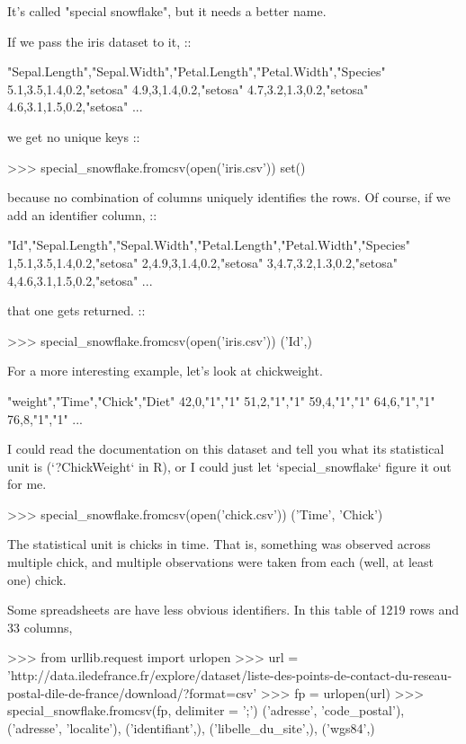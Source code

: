 \documentclass{acm_proc_article-sp}
\begin{document}
It's called "special snowflake", but it needs a better name.

If we pass the iris dataset to it, ::

    "Sepal.Length","Sepal.Width","Petal.Length","Petal.Width","Species"
    5.1,3.5,1.4,0.2,"setosa"
    4.9,3,1.4,0.2,"setosa"
    4.7,3.2,1.3,0.2,"setosa"
    4.6,3.1,1.5,0.2,"setosa"
    ...

we get no unique keys ::

    >>> special_snowflake.fromcsv(open('iris.csv'))                                                                  
    set()

because no combination of columns uniquely identifies the rows.
Of course, if we add an identifier column, ::

    "Id","Sepal.Length","Sepal.Width","Petal.Length","Petal.Width","Species"
    1,5.1,3.5,1.4,0.2,"setosa"
    2,4.9,3,1.4,0.2,"setosa"
    3,4.7,3.2,1.3,0.2,"setosa"
    4,4.6,3.1,1.5,0.2,"setosa"
    ...

that one gets returned. ::

    >>> special_snowflake.fromcsv(open('iris.csv'))                                                                  
    {('Id',)}

For a more interesting example, let's look at chickweight.

    "weight","Time","Chick","Diet"
    42,0,"1","1"
    51,2,"1","1"
    59,4,"1","1"
    64,6,"1","1"
    76,8,"1","1"
    ...

I could read the documentation on this dataset and tell you
what its statistical unit is (`?ChickWeight` in R), or I could
just let `special_snowflake` figure it out for me.

    >>> special_snowflake.fromcsv(open('chick.csv'))
    {('Time', 'Chick')}

The statistical unit is chicks in time. That is, something was
observed across multiple chick, and multiple observations were
taken from each (well, at least one) chick.

Some spreadsheets are have less obvious identifiers. In this
table of 1219 rows and 33 columns,

    >>> from urllib.request import urlopen
    >>> url = 'http://data.iledefrance.fr/explore/dataset/liste-des-points-de-contact-du-reseau-postal-dile-de-france/download/?format=csv'
    >>> fp = urlopen(url)
    >>> special_snowflake.fromcsv(fp, delimiter = ';')
    {('adresse', 'code_postal'),
     ('adresse', 'localite'),
     ('identifiant',),
     ('libelle_du_site',),
     ('wgs84',)}
\end{document}
